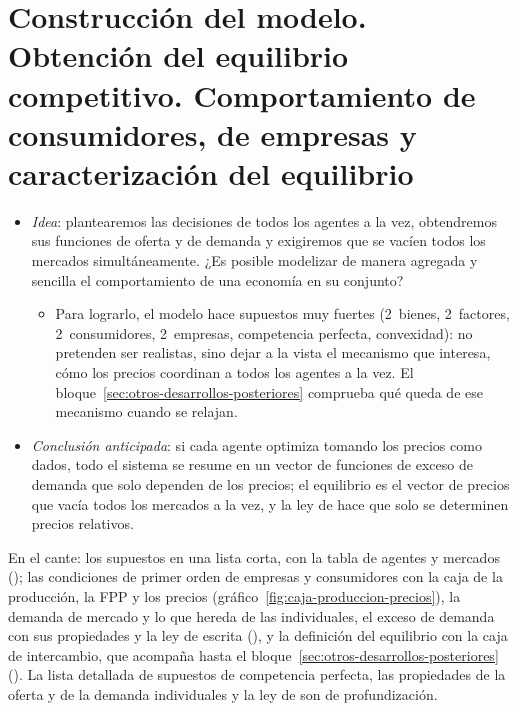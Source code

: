 \documentclass[11pt]{article}
\begin{document}
\section{Construcción del modelo. Obtención del equilibrio\cortetitulo{} competitivo. Comportamiento de consumidores, de empresas\cortetitulo{} y caracterización del equilibrio}\label{sec:construccion-modelo-obtencion}

\begin{itemize}
\item \emph{Idea}: plantearemos las decisiones de todos los agentes a la vez, obtendremos sus funciones de oferta y de demanda y exigiremos que se vacíen todos los mercados simultáneamente. ¿Es posible modelizar de manera agregada y sencilla el comportamiento de una economía en su conjunto?
  \begin{itemize}
  \item Para lograrlo, el modelo hace supuestos muy fuertes (2~bienes, 2~factores, 2~consumidores, 2~empresas, competencia perfecta, convexidad): no pretenden ser realistas, sino dejar a la vista el mecanismo que interesa, cómo los precios coordinan a todos los agentes a la vez. El bloque~\ref{sec:otros-desarrollos-posteriores} comprueba qué queda de ese mecanismo cuando se relajan.
  \end{itemize}
\item \emph{Conclusión anticipada}: si cada agente optimiza tomando los precios como dados, todo el sistema se resume en un vector de funciones de exceso de demanda que solo dependen de los precios; el equilibrio es el vector de precios que vacía todos los mercados a la vez, y la ley de  hace que solo se determinen precios relativos.
\end{itemize}

\begin{notaopositor}
En el cante: los supuestos en una lista corta, con la tabla de agentes y mercados (); las condiciones de primer orden de empresas y consumidores con la caja de la producción, la FPP y los precios (gráfico~\ref{fig:caja-produccion-precios}), la demanda de mercado y lo que hereda de las individuales, el exceso de demanda con sus propiedades y la ley de  escrita (), y la definición del equilibrio con la caja de intercambio, que acompaña hasta el bloque~\ref{sec:otros-desarrollos-posteriores} (). La lista detallada de supuestos de competencia perfecta, las propiedades de la oferta y de la demanda individuales y la ley de  son de profundización.
\end{notaopositor}
\end{document}
